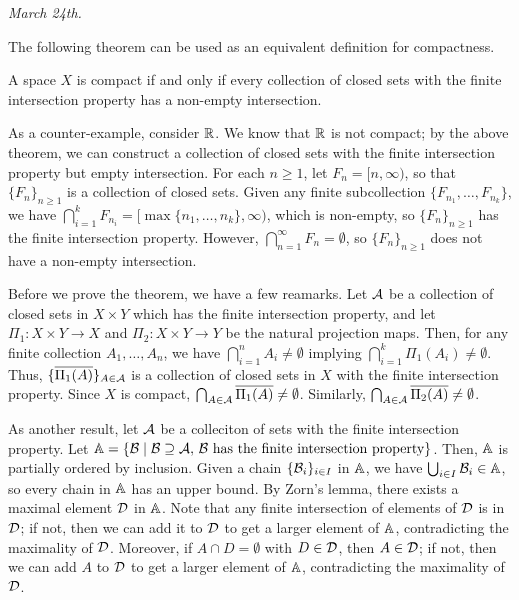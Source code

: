\noindent \textit{March 24th.}

The following theorem can be used as an equivalent definition for compactness.

\begin{theorem}
    A space $X$ is compact if and only if every collection of closed sets with the finite intersection property has a non-empty intersection.
\end{theorem}

As a counter-example, consider $\mathbb{R}$. We know that $\mathbb{R}$ is not compact; by the above theorem, we can construct a collection of closed sets with the finite intersection property but empty intersection. For each $n \geq 1$, let $F_{n} = [n,\infty)$, so that $\{F_{n}\}_{n \geq 1}$ is a collection of closed sets. Given any finite subcollection $\{F_{n_{1}},\ldots,F_{n_{k}}\}$, we have $\bigcap_{i=1}^{k} F_{n_{i}} = [\max\{n_{1},\ldots,n_{k}\},\infty)$, which is non-empty, so $\{F_{n}\}_{n \geq 1}$ has the finite intersection property. However, $\bigcap_{n=1}^{\infty} F_{n} = \emptyset$, so $\{F_{n}\}_{n \geq 1}$ does not have a non-empty intersection.

Before we prove the theorem, we have a few reamarks. Let $\mathcal{A}$ be a collection of closed sets in $X \times Y$ which has the finite intersection property, and let $\Pi_{1} : X \times Y \to X$ and $\Pi_{2} : X \times Y \to Y$ be the natural projection maps. Then, for any finite collection $A_{1},\ldots,A_{n}$, we have $\bigcap_{i=1}^{n} A_{i} \neq \emptyset$ implying $\bigcap_{i=1}^{k} \Pi_{1}(A_{i}) \neq \emptyset$. Thus, $\{\overline{\Pi_{1}(A)}\}_{A \in \mathcal{A}}$ is a collection of closed sets in $X$ with the finite intersection property. Since $X$ is compact, $\bigcap_{A \in \mathcal{A}} \overline{\Pi_{1}(A)} \neq \emptyset$. Similarly, $\bigcap_{A \in \mathcal{A}} \overline{\Pi_{2}(A)} \neq \emptyset$.

As another result, let $\mathcal{A}$ be a colleciton of sets with the finite intersection property. Let $\mathbb{A} = \{\mathcal{B} \mid \mathcal{B} \supseteq \mathcal{A}, \, \mathcal{B} \text{ has the finite intersection property}\}$. Then, $\mathbb{A}$ is partially ordered by inclusion. Given a chain $\{\mathcal{B}_{i}\}_{i \in I}$ in $\mathbb{A}$, we have $\bigcup_{i \in I} \mathcal{B}_{i} \in \mathbb{A}$, so every chain in $\mathbb{A}$ has an upper bound. By Zorn's lemma, there exists a maximal element $\mathcal{D}$ in $\mathbb{A}$. Note that any finite intersection of elements of $\mathcal{D}$ is in $\mathcal{D}$; if not, then we can add it to $\mathcal{D}$ to get a larger element of $\mathbb{A}$, contradicting the maximality of $\mathcal{D}$. Moreover, if $A \cap D = \emptyset$ with $D \in \mathcal{D}$, then $A \in \mathcal{D}$; if not, then we can add $A$ to $\mathcal{D}$ to get a larger element of $\mathbb{A}$, contradicting the maximality of $\mathcal{D}$.

